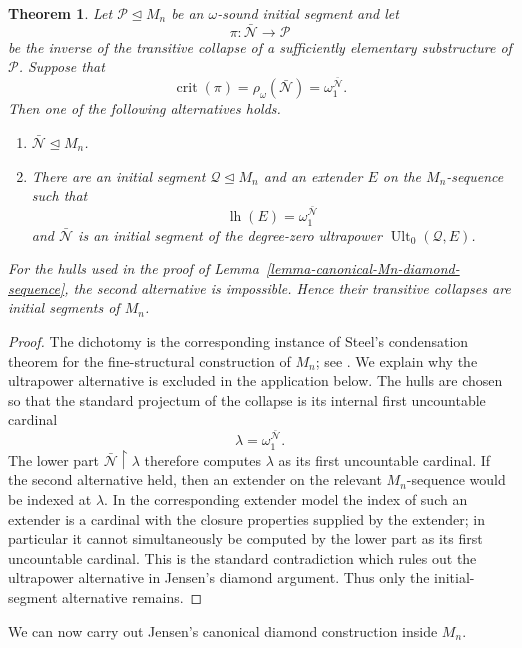 \documentclass[a4paper,11pt]{article}
\newtheorem{theorem}{Theorem}[section]
\begin{document}
\begin{theorem}
\label{theorem-condensation-lower-part-hulls-Mn}
Let $\mathcal P\trianglelefteq M_n$ be an $\omega$-sound initial segment and
let
\[
   \pi:\bar{\mathcal N}\longrightarrow\mathcal P
\]
be the inverse of the transitive collapse of a sufficiently elementary
substructure of $\mathcal P$.  Suppose that
\[
   \operatorname{crit}(\pi)
   =\rho_\omega(\bar{\mathcal N})
   =\omega_1^{\bar{\mathcal N}}.
\]
Then one of the following alternatives holds.
\begin{enumerate}
   \item $\bar{\mathcal N}\trianglelefteq M_n$.
   \item There are an initial segment $\mathcal Q\trianglelefteq M_n$ and an
         extender $E$ on the $M_n$-sequence such that
         \[
            \operatorname{lh}(E)=\omega_1^{\bar{\mathcal N}}
         \]
         and $\bar{\mathcal N}$ is an initial segment of the degree-zero
         ultrapower $\operatorname{Ult}_0(\mathcal Q,E)$.
\end{enumerate}
For the hulls used in the proof of
Lemma~\ref{lemma-canonical-Mn-diamond-sequence}, the second alternative is
impossible.  Hence their transitive collapses are initial segments of $M_n$.
\end{theorem}

\begin{proof}
The dichotomy is the corresponding instance of Steel's condensation theorem
for the fine-structural construction of $M_n$; see \cite{Steel3}.  We explain
why the ultrapower alternative is excluded in the application below.  The
hulls are chosen so that the standard projectum of the collapse is its
internal first uncountable cardinal
\[
   \lambda=\omega_1^{\bar{\mathcal N}}.
\]
The lower part $\bar{\mathcal N}\restriction\lambda$ therefore computes
$\lambda$ as its first uncountable cardinal.  If the second alternative held,
then an extender on the relevant $M_n$-sequence would be indexed at
$\lambda$.  In the corresponding extender model the index of such an
extender is a cardinal with the closure properties supplied by the extender;
in particular it cannot simultaneously be computed by the lower part as its
first uncountable cardinal.  This is the standard contradiction which rules
out the ultrapower alternative in Jensen's diamond argument.  Thus only the
initial-segment alternative remains.
\end{proof}

We can now carry out Jensen's canonical diamond construction inside $M_n$.
\end{document}
